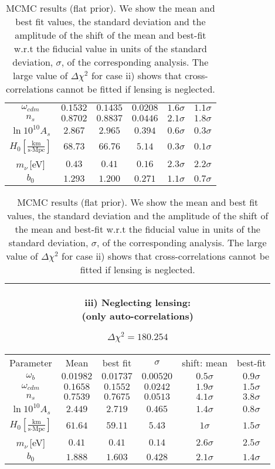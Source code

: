 \begin{table}[!t]
\begin{tabular}{@{}cccccc}
$\omega_{cdm}$ & $0.1532$ & $0.1435$ & $0.0208$ &  \quad$1.6\sigma$ & $1.1\sigma$ \\
$n_s$      & $0.8702$ & $0.8837$ & $0.0446$ &  \quad$2.1\sigma$ & $1.8\sigma$ \\
$\ln10^{10}A_s$ & $ 2.867 $ & $2.965 $ & $ 0.394 $ &  \quad$0.6\sigma$ & $0.3\sigma$ \\
$H_0\left[\frac{\text{km}}{\text{s}\cdot\text{Mpc}}\right]$      & $68.73$ & $66.76$ & $5.14$ &  \quad$0.3\sigma$ & $0.1\sigma$ \\
$m_{\nu}$\,[eV]  & $0.43$ & $0.41$ & $0.16$ &  \quad$2.3\sigma$ & $2.2\sigma$ \\
$b_0$ & $1.293$ & $1.200$ & $0.271$ & $1.1\sigma$ & $0.7\sigma$\\
\end{tabular}
\begin{tabular}{@{}cccccc}
\hline
\multicolumn{6}{c}{\parbox[t]{4.4cm}{iii) Neglecting lensing: \\(only auto-correlations)} $\Delta \chi^2 = 180.254$} \\
\hline
Parameter & Mean & best fit & $\sigma$ & \hspace{-0.52cm} shift: mean & best-fit\\
\hline
$\omega_b$ & $0.01982 $ & $0.01737 $ & $0.00520 $ &  \quad$0.5\sigma$ & $0.9\sigma$ \\
$\omega_{cdm}$ & $0.1658 $ & $0.1552 $ & $0.0242 $ &  \quad$1.9\sigma$ & $1.5\sigma$ \\
$n_s$      & $0.7539 $ & $0.7675 $ & $0.0513 $ &  \quad$4.1\sigma$ & $3.8\sigma$ \\
$\ln10^{10}A_s$ & $2.449 $ & $2.719 $ & $0.465 $ &  \quad$1.4 \sigma$ & $0.8\sigma$ \\
$H_0\left[\frac{\text{km}}{\text{s}\cdot\text{Mpc}}\right]$      & $61.64 $ & $59.11$ & $5.43$ &  \quad$1 \sigma$ & $1.5\sigma$ \\
$m_{\nu}$\,[eV]  & $0.41$ & $0.41$ & $0.14$ &  \quad$2.6\sigma$ & $2.5\sigma$ \\
$b_0$ & $1.888$ & $1.603$ & $0.428$ & $2.1\sigma$ & $1.4\sigma$ \\
\end{tabular}

\caption{MCMC results (flat prior). We show the mean and best fit values, the standard deviation and the amplitude of the shift of the mean and best-fit w.r.t the fiducial value in units of the standard deviation, $\sigma$, of the corresponding analysis. The large value of $\Delta \chi^2$ for case ii) shows that cross-correlations cannot be fitted if lensing is neglected.
}
\label{Table:mcmc-flat-prior}
\end{table}

